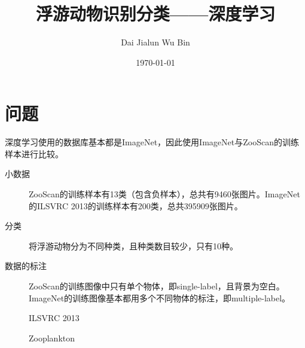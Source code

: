 

\title{\vspace{-2em} 浮游动物识别分类——深度学习\\
\normalsize{}}
\author{Dai Jialun \hspace{0.25in} Wu Bin}
\date{\vspace{-0.7em} \today \vspace{-0.7em}}
\maketitle\thispagestyle{fancy}
\maketitle
\section{问题}
深度学习使用的数据库基本都是ImageNet，因此使用ImageNet与ZooScan的训练样本进行比较。
\begin{description}
\item[小数据] ZooScan的训练样本有13类（包含负样本），总共有9460张图片。ImageNet的ILSVRC 2013的训练样本有200类，总共395909张图片。
\item[分类] 将浮游动物分为不同种类，且种类数目较少，只有10种。
\item[数据的标注] ZooScan的训练图像中只有单个物体，即single-label，且背景为空白。ImageNet的训练图像基本都用多个不同物体的标注，即multiple-label。
\end{description}
\begin{figure}[!ht]
  \centering 
  \caption{ILSVRC 2013}
\end{figure}

\begin{figure}[!ht]
  \centering 
  \caption{Zooplankton}
\end{figure}


